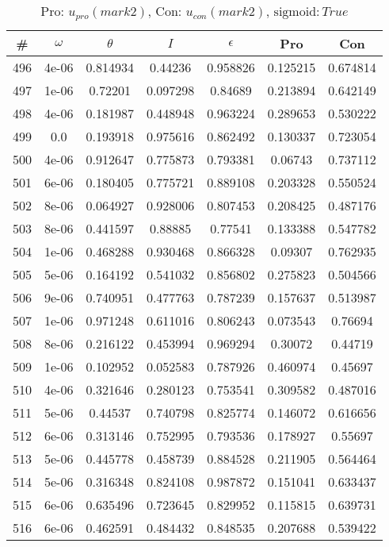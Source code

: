 \newpage
\begin{table}
\caption{Pro: $u_{pro} (mark 2)$, Con: $u_{con} (mark 2)$, $\mathrm{sigmoid}: True$}
\begin{tabular*}{\linewidth}{c|c|c|c|c|c|c}
\# & $\omega$ & $\theta$ & $I$ & $\epsilon$ & Pro & Con \\
\hline
496 & 4e-06 & 0.814934 & 0.44236 & 0.958826 & 0.125215 & 0.674814\\
497 & 1e-06 & 0.72201 & 0.097298 & 0.84689 & 0.213894 & 0.642149\\
498 & 4e-06 & 0.181987 & 0.448948 & 0.963224 & 0.289653 & 0.530222\\
499 & 0.0 & 0.193918 & 0.975616 & 0.862492 & 0.130337 & 0.723054\\
500 & 4e-06 & 0.912647 & 0.775873 & 0.793381 & 0.06743 & 0.737112\\
501 & 6e-06 & 0.180405 & 0.775721 & 0.889108 & 0.203328 & 0.550524\\
502 & 8e-06 & 0.064927 & 0.928006 & 0.807453 & 0.208425 & 0.487176\\
503 & 8e-06 & 0.441597 & 0.88885 & 0.77541 & 0.133388 & 0.547782\\
504 & 1e-06 & 0.468288 & 0.930468 & 0.866328 & 0.09307 & 0.762935\\
505 & 5e-06 & 0.164192 & 0.541032 & 0.856802 & 0.275823 & 0.504566\\
506 & 9e-06 & 0.740951 & 0.477763 & 0.787239 & 0.157637 & 0.513987\\
507 & 1e-06 & 0.971248 & 0.611016 & 0.806243 & 0.073543 & 0.76694\\
508 & 8e-06 & 0.216122 & 0.453994 & 0.969294 & 0.30072 & 0.44719\\
509 & 1e-06 & 0.102952 & 0.052583 & 0.787926 & 0.460974 & 0.45697\\
510 & 4e-06 & 0.321646 & 0.280123 & 0.753541 & 0.309582 & 0.487016\\
511 & 5e-06 & 0.44537 & 0.740798 & 0.825774 & 0.146072 & 0.616656\\
512 & 6e-06 & 0.313146 & 0.752995 & 0.793536 & 0.178927 & 0.55697\\
513 & 5e-06 & 0.445778 & 0.458739 & 0.884528 & 0.211905 & 0.564464\\
514 & 5e-06 & 0.316348 & 0.824108 & 0.987872 & 0.151041 & 0.633437\\
515 & 6e-06 & 0.635496 & 0.723645 & 0.829952 & 0.115815 & 0.639731\\
516 & 6e-06 & 0.462591 & 0.484432 & 0.848535 & 0.207688 & 0.539422\\

\end{tabular*}
\end{table}
